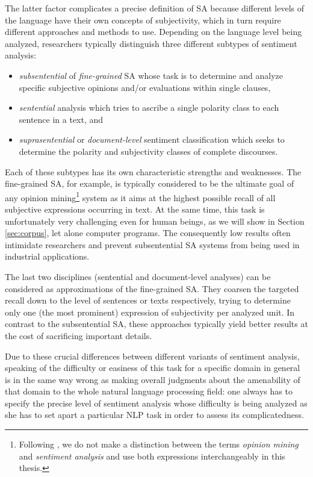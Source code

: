 The latter factor complicates a precise definition of SA because
different levels of the language have their own concepts of
subjectivity, which in turn require different approaches and methods
to use.  Depending on the language level being analyzed, researchers
typically distinguish three different subtypes of sentiment analysis:
\begin{itemize}
  \item\emph{subsentential} of \emph{fine-grained} SA whose task is to
    determine and analyze specific subjective opinions and/or
    evaluations within single clauses,
  \item\emph{sentential} analysis which tries to ascribe a single
    polarity class to each sentence in a text, and
  \item\emph{suprasentential} or \emph{document-level} sentiment
    classification which seeks to determine the polarity and
    subjectivity classes of complete discourses.
\end{itemize}

Each of these subtypes has its own characteristic strengths and
weaknesses.  The fine-grained SA, for example, is typically considered
to be the ultimate goal of any opinion mining\footnote{Following
  \citet{Liu:12}, we do not make a distinction between the terms
  \emph{opinion mining} and \emph{sentiment analysis} and use both
  expressions interchangeably in this thesis.}  system as it aims at
the highest possible recall of all subjective expressions occurring in
text.  At the same time, this task is unfortunately very challenging
even for human beings, as we will show in Section \ref{sec:corpus},
let alone computer programs.  The consequently low results often
intimidate researchers and prevent subsentential SA systems from being
used in industrial applications.

The last two disciplines (sentential and document-level analyses) can
be considered as approximations of the fine-grained SA.  They coarsen
the targeted recall down to the level of sentences or texts
respectively, trying to determine only one (the most prominent)
expression of subjectivity per analyzed unit.  In contrast to the
subsentential SA, these approaches typically yield better results at
the cost of sacrificing important details.

Due to these crucial differences between different variants of
sentiment analysis, speaking of the difficulty or easiness of this
task for a specific domain in general is in the same way wrong as
making overall judgments about the amenability of that domain to the
whole natural language processing field: one always has to specify the
precise level of sentiment analysis whose difficulty is being analyzed
as she has to set apart a particular NLP task in order to assess its
complicatedness.

